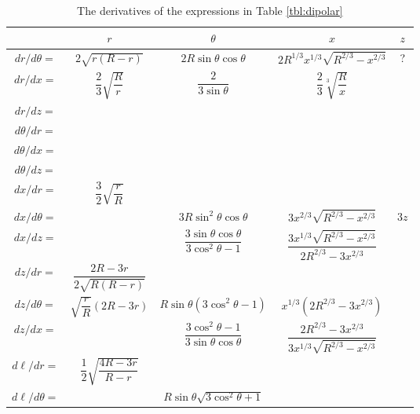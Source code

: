 \documentclass{book}
\begin{document}
\begin{table}[!p]
    \centering
    \caption{The derivatives of the expressions in Table \ref{tbl:dipolar}}
    \label{tbl:dipolarderiv}
    \begin{tabular}{c|cccc}
        & $r$ & $\theta$ & $x$ & $z$ \\[5pt]
        \hline
        $dr/d\theta =$ & $2\sqrt{r(R-r)}$ & $2R\sin\theta\cos\theta$ & $2R^{1/3}x^{1/3}\sqrt{R^{2/3}-x^{2/3}}$ & ? \\[8pt]
        $dr/dx =$      & $\dfrac23\sqrt{\dfrac{R}{r}}$ & $\dfrac{2}{3\sin\theta}$ & $\dfrac23\sqrt[3]{\dfrac{R}{x}}$ & \\[8pt]
        $dr/dz =$      & & & & \\[8pt]
        \hline
        $d\theta/dr =$ & & & & \\[8pt]
        $d\theta/dx =$ & & & & \\[8pt]
        $d\theta/dz =$ & & & & \\[8pt]
        \hline
        $dx/dr =$      & $\dfrac32\sqrt{\dfrac{r}{R}}$ & & & \\[8pt]
        $dx/d\theta =$ & & $3R\sin^2\theta\cos\theta$ & $3x^{2/3} \sqrt{R^{2/3} - x^{2/3}}$ & $3z$ \\[8pt]
        $dx/dz =$      & & $\dfrac{3\sin\theta\cos\theta}{3\cos^2\theta-1}$ & $\dfrac{3x^{1/3}\sqrt{R^{2/3} - x^{2/3}}}{2R^{2/3} - 3x^{2/3}}$ & \\[8pt]
        \hline
        $dz/dr =$      & $\dfrac{2R-3r}{2\sqrt{R(R-r)}}$ & & & \\[8pt]
        $dz/d\theta =$ & $\sqrt{\dfrac{r}{R}}\left(2R-3r\right)$ & $R\sin\theta(3\cos^2\theta - 1)$ & $x^{1/3}(2R^{2/3} - 3x^{2/3})$ & \\[8pt]
        $dz/dx =$      & & $\dfrac{3\cos^2\theta-1}{3\sin\theta\cos\theta}$ & $\dfrac{2R^{2/3} - 3x^{2/3}}{3x^{1/3}\sqrt{R^{2/3} - x^{2/3}}}$ & \\[8pt]
        \hline
        $d\ell/dr =$ & $\dfrac12 \sqrt{\dfrac{4R-3r}{R-r}}$ & & & \\[8pt]
        $d\ell/d\theta =$ & & $R\sin\theta \sqrt{3\cos^2\theta + 1}$ & &
    \end{tabular}
\end{table}
\end{document}
